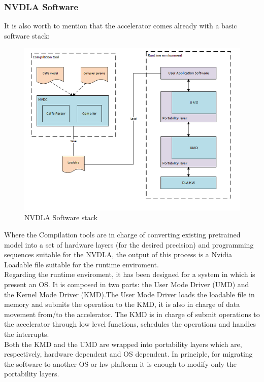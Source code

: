 \subsubsection{ NVDLA Software }
It is also worth to mention that the accelerator comes already with a basic software stack:
\begin{figure}[H] 
\centering
\captionsetup{justification=centering}
  \includegraphics[scale=0.8]{./figure/nvdla_software.PNG}
\caption{NVDLA Software stack}
  \label{fig:nvdlasw}
\end{figure} 

Where the Compilation tools are in charge of converting existing pretrained model into a set of hardware layers (for the desired precision) and programming sequences suitable for the NVDLA, the output of this process is a Nvidia Loadable file suitable for the runtime enviroment.\\
Regarding the runtime enviroment, it has been designed for a system in which is present an OS. It is composed in two parts: the User Mode Driver (UMD) and the Kernel Mode  Driver (KMD).\newline The User Mode Driver loads the loadable file in memory and submits the operation to the KMD, it is also in charge of data movement from/to the accelerator. \newline The KMD is in charge of submit operations to the accelerator through low level functions, schedules the operations and handles the interrupts.\\
Both the KMD and the UMD are wrapped into portability layers which are, respectively, hardware dependent and OS dependent. In principle, for migrating the software to another OS or hw plaftorm it is enough to modify only the portability layers.
	\newpage
